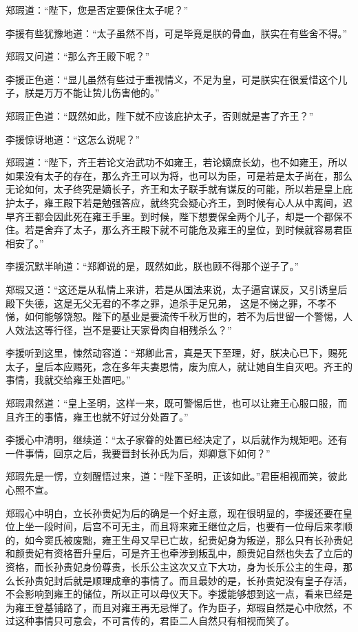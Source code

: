 郑瑕道：“陛下，您是否定要保住太子呢？”

李援有些犹豫地道：“太子虽然不肖，可是毕竟是朕的骨血，朕实在有些舍不得。”

郑瑕又问道：“那么齐王殿下呢？”

李援正色道：“显儿虽然有些过于重视情义，不足为皇，可是朕实在很爱惜这个儿子，朕是万万不能让贽儿伤害他的。”

郑瑕正色道：“既然如此，陛下就不应该庇护太子，否则就是害了齐王？”

李援惊讶地道：“这怎么说呢？”

郑瑕道：“陛下，齐王若论文治武功不如雍王，若论嫡庶长幼，也不如雍王，所以如果没有太子的存在，那么齐王可以为将，也可以为臣，可是若是太子尚在，那么无论如何，太子终究是嫡长子，齐王和太子联手就有谋反的可能，所以若是皇上庇护太子，雍王殿下若是勉强答应，就终究会疑心齐王，到时候有心人从中离间，迟早齐王都会因此死在雍王手里。到时候，陛下想要保全两个儿子，却是一个都保不住。若是舍弃了太子，那么齐王殿下就不可能危及雍王的皇位，到时候就容易君臣相安了。”

李援沉默半晌道：“郑卿说的是，既然如此，朕也顾不得那个逆子了。”

郑瑕又道：“这还是从私情上来讲，若是从国法来说，太子逼宫谋反，又引诱皇后殿下失德，这是无父无君的不孝之罪，追杀手足兄弟， 这是不悌之罪，不孝不悌，如何能够饶恕。陛下的基业是要流传千秋万世的，若不为后世留一个警惕，人人效法这等行径，岂不是要让天家骨肉自相残杀么？”

李援听到这里，悚然动容道：“郑卿此言，真是天下至理，好，朕决心已下，赐死太子，皇后本应赐死，念在多年夫妻恩情，废为庶人，就让她自生自灭吧。齐王的事情，我就交给雍王处置吧。”

郑瑕肃然道：“皇上圣明，这样一来，既可警惕后世，也可以让雍王心服口服，而且齐王的事情，雍王也就不好过分处置了。”

李援心中清明，继续道：“太子家眷的处置已经决定了，以后就作为规矩吧。还有一件事情，回京之后，我要晋封长孙氏为后，郑卿意下如何？”

郑瑕先是一愣，立刻醒悟过来，道：“陛下圣明，正该如此。”君臣相视而笑，彼此心照不宣。

郑瑕心中明白，立长孙贵妃为后的确是一个好主意，现在很明显的，李援还要在皇位上坐一段时间，后宫不可无主，而且将来雍王继位之后，也要有一位母后来孝顺的，如今窦氏被废黜，雍王生母又早已亡故，纪贵妃身为叛逆，那么只有长孙贵妃和颜贵妃有资格晋升皇后，可是齐王也牵涉到叛乱中，颜贵妃自然也失去了立后的资格，而长孙贵妃身份尊贵，长乐公主这次又立下大功，身为长乐公主的生母，那么长孙贵妃封后就是顺理成章的事情了。而且最妙的是，长孙贵妃没有皇子存活，不会影响到雍王的储位，所以正可以母仪天下。李援能够想到这一点，看来已经是为雍王登基铺路了，而且对雍王再无忌惮了。作为臣子，郑瑕自然是心中欣然，不过这种事情只可意会，不可言传的，君臣二人自然只有相视而笑了。

